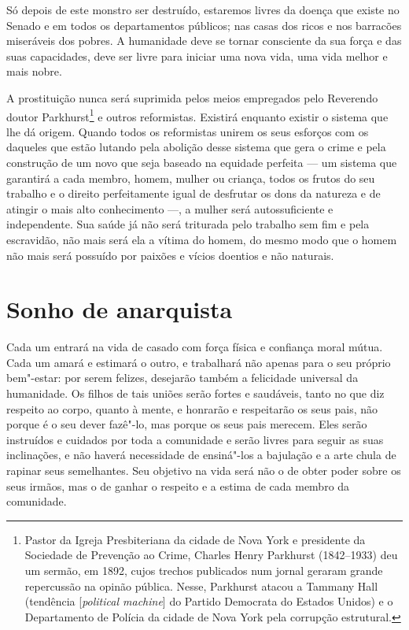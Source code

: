 Só depois de este monstro ser destruído, estaremos livres da doença que
existe no Senado e em todos os departamentos públicos; nas casas dos
ricos e nos barracões miseráveis dos pobres. A humanidade deve
se tornar consciente da sua força e das suas capacidades, deve ser livre
para iniciar uma nova vida, uma vida melhor e mais nobre.

A prostituição nunca será suprimida pelos meios empregados pelo
Reverendo doutor Parkhurst\footnote{Pastor da Igreja Presbiteriana da cidade de Nova York e presidente da Sociedade de Prevenção ao Crime, Charles Henry Parkhurst (1842--1933) deu um sermão, em 1892, cujos trechos publicados num jornal geraram grande repercussão na opinão pública. Nesse, Parkhurst atacou a Tammany Hall (tendência [\textit{political machine}] do Partido Democrata do Estados Unidos) e o Departamento de Polícia da cidade de Nova York pela corrupção estrutural.} e outros reformistas. Existirá enquanto
existir o sistema que lhe dá origem. Quando todos os reformistas
unirem os seus esforços com os daqueles que estão lutando pela abolição desse sistema
que gera o crime e pela construção de um novo que seja baseado na
equidade perfeita --- um sistema que garantirá a cada membro, homem,
mulher ou criança, todos os frutos do seu trabalho e o direito
perfeitamente igual de desfrutar os dons da natureza e de atingir o
mais alto conhecimento ---, a mulher será autossuficiente e independente.
Sua saúde já não será triturada pelo trabalho sem fim e pela escravidão,
não mais será ela a vítima do homem, do mesmo modo que o homem não mais
será possuído por paixões e vícios doentios e não naturais.

\section{Sonho de anarquista}

Cada um entrará na vida de casado com força física e confiança moral
mútua. Cada um amará e estimará o outro, e trabalhará não apenas para o
seu próprio bem"-estar: por serem felizes, desejarão também a felicidade
universal da humanidade. Os filhos de tais uniões serão fortes e
saudáveis, tanto no que diz respeito ao corpo, quanto à mente, e
honrarão e respeitarão os seus pais, não porque é o seu dever fazê"-lo,
mas porque os seus pais merecem. Eles serão instruídos e cuidados por
toda a comunidade e serão livres para seguir as suas inclinações, e não
haverá necessidade de ensiná"-los a bajulação e a arte chula de rapinar
seus semelhantes. Seu objetivo na vida será não o de obter poder sobre
os seus irmãos, mas o de ganhar o respeito e a estima de cada membro da
comunidade.

